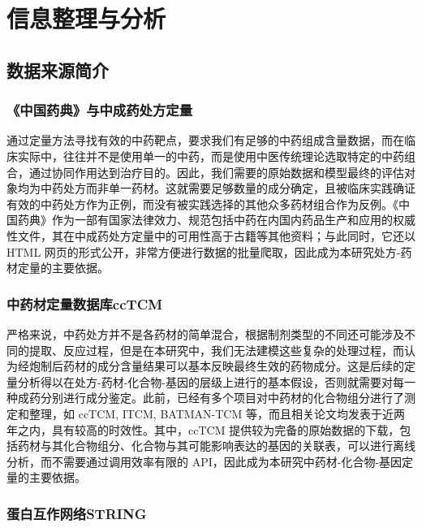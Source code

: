 
\chapter{信息整理与分析}

\section{数据来源简介}

\subsection{《中国药典》与中成药处方定量}

通过定量方法寻找有效的中药靶点，要求我们有足够的中药组成含量数据，而在临床实际中，往往并不是使用单一的中药，而是使用中医传统理论选取特定的中药组合，通过协同作用达到治疗目的。因此，我们需要的原始数据和模型最终的评估对象均为中药处方而非单一药材。这就需要足够数量的成分确定，且被临床实践确证有效的中药处方作为正例，而没有被实践选择的其他众多药材组合作为反例。《中国药典》作为一部有国家法律效力、规范包括中药在内国内药品生产和应用的权威性文件，其在中成药处方定量中的可用性高于古籍等其他资料；与此同时，它还以 HTML 网页的形式公开，非常方便进行数据的批量爬取，因此成为本研究处方-药材定量的主要依据。\cite{2020-ie}

\subsection{中药材定量数据库ccTCM}

严格来说，中药处方并不是各药材的简单混合，根据制剂类型的不同还可能涉及不同的提取、反应过程，但是在本研究中，我们无法建模这些复杂的处理过程，而认为经炮制后药材的成分含量结果可以基本反映最终生效的药物成分。这是后续的定量分析得以在处方-药材-化合物-基因的层级上进行的基本假设，否则就需要对每一种成药分别进行成分鉴定。此前，已经有多个项目对中药材的化合物组分进行了测定和整理，如 ccTCM\cite{Yang_Zhu_Yao_Chen_Chen_Gu_Jiang_Chen_Zhang_Wu_et_al._2023}, ITCM\cite{Tian_Zhang_Yuan_Wang_Lv_Wang_Fang_Fu_Yang_Zu_et_al._2023}, BATMAN-TCM\cite{Kong_Liu_Zhang_Cheng_Mei_Li_Liu_Diao_Ma_Jiang_et_al._2024} 等，而且相关论文均发表于近两年之内，具有较高的时效性。其中，ccTCM 提供较为完备的原始数据的下载，包括药材与其化合物组分、化合物与其可能影响表达的基因的关联表，可以进行离线分析，而不需要通过调用效率有限的 API，因此成为本研究中药材-化合物-基因定量的主要依据。

\subsection{蛋白互作网络STRING}

